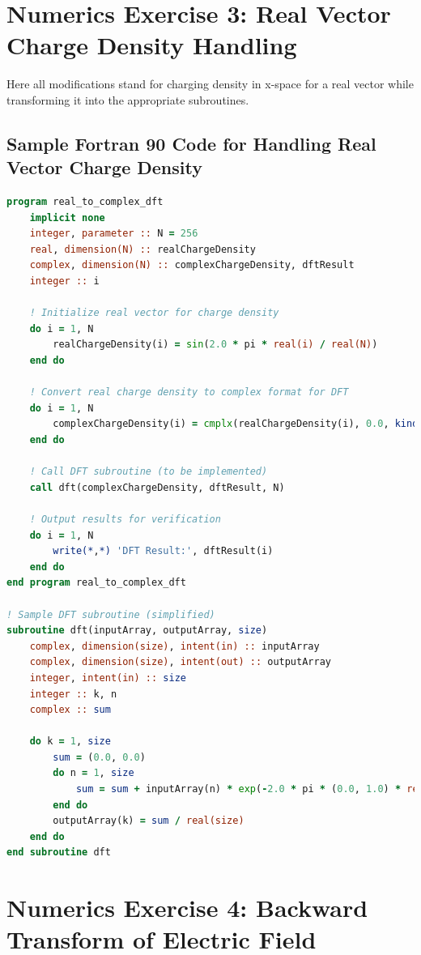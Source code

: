 \documentclass{article}
\begin{document}
\section*{Numerics Exercise 3: Real Vector Charge Density Handling}

Here all modifications stand for charging density in x-space for a real vector while transforming it into the appropriate subroutines.

\subsection*{Sample Fortran 90 Code for Handling Real Vector Charge Density}
\begin{lstlisting}[language=fortran]
program real_to_complex_dft
    implicit none
    integer, parameter :: N = 256
    real, dimension(N) :: realChargeDensity
    complex, dimension(N) :: complexChargeDensity, dftResult
    integer :: i

    ! Initialize real vector for charge density
    do i = 1, N
        realChargeDensity(i) = sin(2.0 * pi * real(i) / real(N))
    end do

    ! Convert real charge density to complex format for DFT
    do i = 1, N
        complexChargeDensity(i) = cmplx(realChargeDensity(i), 0.0, kind=kind(0.0))
    end do

    ! Call DFT subroutine (to be implemented)
    call dft(complexChargeDensity, dftResult, N)

    ! Output results for verification
    do i = 1, N
        write(*,*) 'DFT Result:', dftResult(i)
    end do
end program real_to_complex_dft

! Sample DFT subroutine (simplified)
subroutine dft(inputArray, outputArray, size)
    complex, dimension(size), intent(in) :: inputArray
    complex, dimension(size), intent(out) :: outputArray
    integer, intent(in) :: size
    integer :: k, n
    complex :: sum

    do k = 1, size
        sum = (0.0, 0.0)
        do n = 1, size
            sum = sum + inputArray(n) * exp(-2.0 * pi * (0.0, 1.0) * real(n - 1) * real(k - 1) / real(size))
        end do
        outputArray(k) = sum / real(size)
    end do
end subroutine dft
\end{lstlisting}

\section*{Numerics Exercise 4: Backward Transform of Electric Field}
\end{document}
